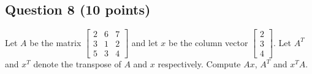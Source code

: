 \documentclass[12pt, border = 4pt, multi]{article} %
\begin{document}
\subsection*{Question 8 (10 points)}
Let $A$ be the matrix 
$\left[ \begin{array}{ccc}
     2 & 6 & 7 \\ 
     3 & 1 & 2 \\
     5 & 3 & 4 
    \end{array} 
\right]$
and let $x$ be the column vector
$\left[ \begin{array}{c}
     2 \\ 
     3 \\
     4  
    \end{array} 
\right]$. Let $A^{T}$ and $x^{T}$ denote the transpose of $A$ and $x$ respectively. Compute $Ax$, $A^{T}$ and $x^{T}A$.\\
\\
\end{document}
